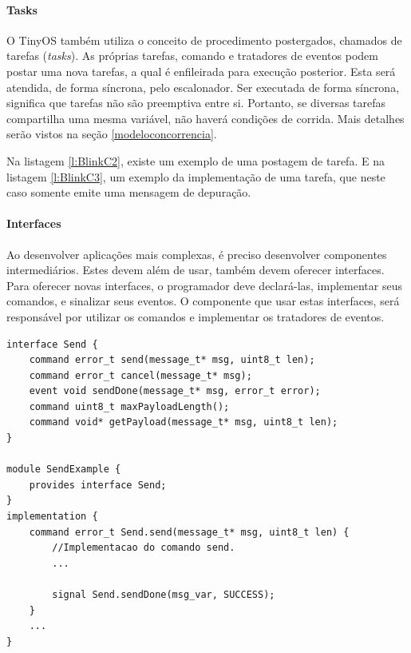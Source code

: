 \paragraph{Tasks}
O TinyOS também utiliza o conceito de procedimento postergados, chamados de tarefas (\textit{tasks}). As próprias
tarefas, comando e tratadores de eventos podem postar uma nova tarefas, a qual é enfileirada para execução posterior.
Esta será atendida, de forma síncrona, pelo escalonador.
Ser executada de forma síncrona, significa que tarefas não são preemptiva entre si. Portanto, se diversas tarefas
compartilha uma mesma variável, não haverá condições de corrida. Mais detalhes serão vistos na seção
\ref{modeloconcorrencia}.



Na listagem \ref{l:BlinkC2}, existe um exemplo de uma postagem de tarefa. E na listagem \ref{l:BlinkC3}, um exemplo da
implementação de uma tarefa, que neste caso somente emite uma mensagem de depuração.

\paragraph{Interfaces}
Ao desenvolver aplicações mais complexas, é preciso desenvolver componentes intermediários. Estes devem além de usar,
também devem oferecer interfaces. Para oferecer novas interfaces, o programador deve declará-las, implementar seus 
comandos, e sinalizar seus eventos. O componente que usar estas interfaces, será responsável por utilizar os comandos e
implementar os tratadores de eventos.
\begin{lstlisting}[caption=interface, label=interface]
interface Send {
    command error_t send(message_t* msg, uint8_t len);
    command error_t cancel(message_t* msg);
    event void sendDone(message_t* msg, error_t error);
    command uint8_t maxPayloadLength();
    command void* getPayload(message_t* msg, uint8_t len);
}

module SendExample {
    provides interface Send;
}
implementation {
    command error_t Send.send(message_t* msg, uint8_t len) {
        //Implementacao do comando send.
        ...

        signal Send.sendDone(msg_var, SUCCESS);
    }
    ...
}
\end{lstlisting}
